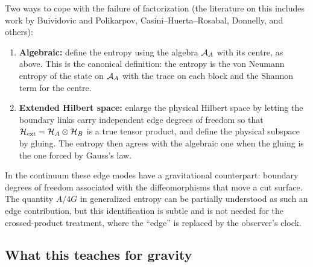 Two ways to cope with the failure of factorization (the literature on this includes work by Buividovic and Polikarpov, Casini--Huerta--Rosabal, Donnelly, and others):
\begin{enumerate}
\item \textbf{Algebraic:} define the entropy using the algebra $\mathcal{A}_A$ with its centre, as above. This is the canonical definition: the entropy is the von Neumann entropy of the state on $\mathcal{A}_A$ with the trace on each block and the Shannon term for the centre.
\item \textbf{Extended Hilbert space:} enlarge the physical Hilbert space by letting the boundary links carry independent edge degrees of freedom so that $\mathcal{H}_{\rm ext}=\mathcal{H}_A\otimes\mathcal{H}_B$ is a true tensor product, and define the physical subspace by gluing. The entropy then agrees with the algebraic one when the gluing is the one forced by Gauss's law.
\end{enumerate}
In the continuum these edge modes have a gravitational counterpart: boundary degrees of freedom associated with the diffeomorphisms that move a cut surface. The quantity $A/4G$ in generalized entropy can be partially understood as such an edge contribution, but this identification is subtle and is not needed for the crossed-product treatment, where the ``edge'' is replaced by the observer's clock.

\subsection{What this teaches for gravity}

